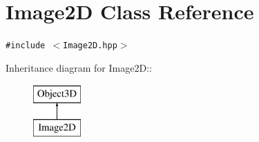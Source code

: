 \hypertarget{classm3g_1_1Image2D}{
\section{Image2D Class Reference}
\label{classm3g_1_1Image2D}
}
{\tt \#include $<$Image2D.hpp$>$}

Inheritance diagram for Image2D::\begin{figure}[H]
\begin{center}
\leavevmode
\includegraphics[height=2cm]{classm3g_1_1Image2D}
\end{center}
\end{figure}
